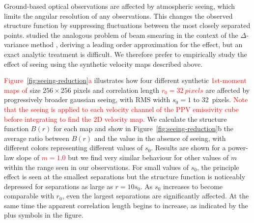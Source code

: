 \documentclass[fleqn,usenatbib, useAMS, a4paper]{mnras}
\begin{document}
Ground-based optical observations are affected by atmospheric seeing,
which limits the angular resolution of any observations.
This changes the observed structure function by suppressing fluctuations
between the most closely separated points.
\citet{Bensch:2001l} studied the  analogous problem
of beam smearing in the context of the \(\Delta\)-variance method \citep{Stutzki:1998a}, 
deriving a leading order approximation for the effect,
but an exact analytic treatment is difficult.
We therefore prefer to empirically study the effect of seeing using the
synthetic velocity maps described above.

\textcolor{red}{Figure~\ref{fig:seeing-reduction}a} illustrates how four different
synthetic \textcolor{red}{1st-moment maps of} size \(256\times256\) pixels
and correlation length \textcolor{red}{\(r_0 = \SI{32}{pixels}\)}
are affected by progressively broader gaussian seeing,
with RMS width \(s_0 = 1\) to \SI{32}{pixels}.
\textcolor{red}{%
  Note that the seeing is applied to each velocity channel of the
  PPV emissivity cube before integrating to find the 2D velocity map.
}
We calculate the structure function \(B(r)\) for each map and show
in Figure~\ref{fig:seeing-reduction}b the average ratio between
\(B(r)\) and the value in the absence of seeing,
with different colors representing different values of \(s_0\).
Results are shown for a power-law slope of \textcolor{red}{\(m = 1.0\)}
but we find very similar behaviour for other values of \(m\) within the range
seen in our observations.
For small values of \(s_0\), the principle effect is seen at
the smallest separations but the structure function is noticeably depressed
for separations as large as \(r = 10 s_0\).
As \(s_0\) increases to become comparable with \(r_0\),
even the largest separations are significantly affected.
At the same time the apparent correlation length begins to increase,
as indicated by the plus symbols in the figure.
\end{document}
